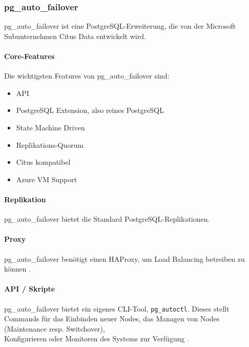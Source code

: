 
\clearpage
\begin{flushleft}
    \subsubsection{pg\_auto\_failover}
    pg\_auto\_failover ist eine PostgreSQL-Erweiterung, die von der Microsoft Subunternehmen Citus Data entwickelt wird.
\end{flushleft}
\begin{flushleft}
    \paragraph{Core-Features}
    Die wichtigsten Features von pg\_auto\_failover sind:
    \begin{itemize}
        \item API
        \item PostgreSQL Extension, also reines PostgreSQL
        \item State Machine Driven
        \item Replikations-Quorum
        \item Citus kompatibel
        \item Azure VM Support
    \end{itemize}
\end{flushleft}
\begin{flushleft}
    \paragraph{Replikation}
    pg\_auto\_failover bietet die Standard PostgreSQL-Replikationen.
\end{flushleft}
\begin{flushleft}
    \paragraph{Proxy}
    pg\_auto\_failover benötigt einen \Gls{HAProxy}, um Load Balancing betreiben zu können  \cite{VYXTI7BS}.
\end{flushleft}
\begin{flushleft}
    \paragraph{API / Skripte}
    pg\_auto\_failover bietet ein eigenes CLI-Tool, \texttt{pg\_autoctl}.
    Dieses stellt Commands für das Einbinden neuer Nodes,
    das Managen von Nodes (Maintenance resp. Switchover),\\
    Konfigurieren oder Monitoren des Systems zur Verfügung \cite{4X2AKDB6}.
\end{flushleft}
